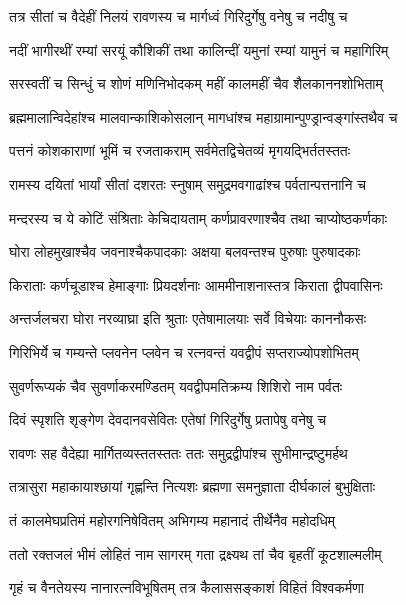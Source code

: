 \twolineshloka
{तत्र सीतां च वैदेहीं निलयं रावणस्य च}
{मार्गध्वं गिरिदुर्गेषु वनेषु च नदीषु च} %

\twolineshloka
{नदीं भागीरथीं रम्यां सरयूं कौशिकीं तथा}
{कालिन्दीं यमुनां रम्यां यामुनं च महागिरिम्} %

\twolineshloka
{सरस्वतीं च सिन्धुं च शोणं मणिनिभोदकम्}
{महीं कालमहीं चैव शैलकाननशोभिताम्} %

\twolineshloka
{ब्रह्ममालान्विदेहांश्च मालवान्काशिकोसलान्}
{मागधांश्च महाग्रामान्पुण्ड्रान्वङ्गांस्तथैव च} %

\twolineshloka
{पत्तनं कोशकाराणां भूमिं च रजताकराम्}
{सर्वमेतद्विचेतव्यं मृगयद्भिर्ततस्ततः} %

\twolineshloka
{रामस्य दयितां भार्यां सीतां दशरतः स्नुषाम्}
{समुद्रमवगाढांश्च पर्वतान्पत्तनानि च} %

\twolineshloka
{मन्दरस्य च ये कोटिं संश्रिताः केचिदायताम्}
{कर्णप्रावरणाश्चैव तथा चाप्योष्ठकर्णकाः} %

\twolineshloka
{घोरा लोहमुखाश्चैव जवनाश्चैकपादकाः}
{अक्षया बलवन्तश्च पुरुषाः पुरुषादकाः} %

\twolineshloka
{किराताः कर्णचूडाश्च हेमाङ्गाः प्रियदर्शनाः}
{आममीनाशनास्तत्र किराता द्वीपवासिनः} %

\twolineshloka
{अन्तर्जलचरा घोरा नरव्याघ्रा इति श्रुताः}
{एतेषामालयाः सर्वे विचेयाः काननौकसः} %

\twolineshloka
{गिरिभिर्ये च गम्यन्ते प्लवनेन प्लवेन च}
{रत्नवन्तं यवद्वीपं सप्तराज्योपशोभितम्} %

\twolineshloka
{सुवर्णरूप्यकं चैव सुवर्णाकरमण्डितम्}
{यवद्वीपमतिक्रम्य शिशिरो नाम पर्वतः} %

\twolineshloka
{दिवं स्पृशति शृङ्गेण देवदानवसेवितः}
{एतेषां गिरिदुर्गेषु प्रतापेषु वनेषु च} %

\twolineshloka
{रावणः सह वैदेह्या मार्गितव्यस्ततस्ततः}
{ततः समुद्रद्वीपांश्च सुभीमान्द्रष्टुमर्हथ} %

\twolineshloka
{तत्रासुरा महाकायाश्छायां गृह्णन्ति नित्यशः}
{ब्रह्मणा समनुज्ञाता दीर्घकालं बुभुक्षिताः} %

\twolineshloka
{तं कालमेघप्रतिमं महोरगनिषेवितम्}
{अभिगम्य महानादं तीर्थेनैव महोदधिम्} %

\twolineshloka
{ततो रक्तजलं भीमं लोहितं नाम सागरम्}
{गता द्रक्ष्यथ तां चैव बृहतीं कूटशाल्मलीम्} %

\twolineshloka
{गृहं च वैनतेयस्य नानारत्नविभूषितम्}
{तत्र कैलाससङ्काशं विहितं विश्वकर्मणा} %

